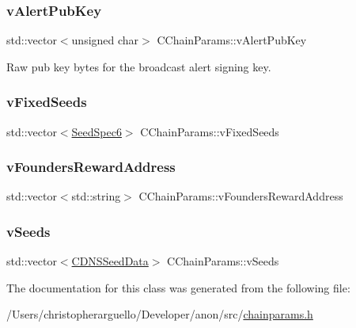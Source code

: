 \subsubsection{\texorpdfstring{v\+Alert\+Pub\+Key}{vAlertPubKey}}
{\footnotesize\ttfamily std\+::vector$<$unsigned char$>$ C\+Chain\+Params\+::v\+Alert\+Pub\+Key\hspace{0.3cm}{\ttfamily [protected]}}



Raw pub key bytes for the broadcast alert signing key. 

\mbox{\label{class_c_chain_params_a6853ff4c88ca3df1d864a8d72153614d}} 
\subsubsection{\texorpdfstring{v\+Fixed\+Seeds}{vFixedSeeds}}
{\footnotesize\ttfamily std\+::vector$<$\mbox{\hyperlink{struct_seed_spec6}{Seed\+Spec6}}$>$ C\+Chain\+Params\+::v\+Fixed\+Seeds\hspace{0.3cm}{\ttfamily [protected]}}

\mbox{\label{class_c_chain_params_a54c46bc5f678eda307507f3c4310361b}} 
\subsubsection{\texorpdfstring{v\+Founders\+Reward\+Address}{vFoundersRewardAddress}}
{\footnotesize\ttfamily std\+::vector$<$std\+::string$>$ C\+Chain\+Params\+::v\+Founders\+Reward\+Address\hspace{0.3cm}{\ttfamily [protected]}}

\mbox{\label{class_c_chain_params_a9ce50b4162fb2ebf5bd72ad4045aa70c}} 
\subsubsection{\texorpdfstring{v\+Seeds}{vSeeds}}
{\footnotesize\ttfamily std\+::vector$<$\mbox{\hyperlink{struct_c_d_n_s_seed_data}{C\+D\+N\+S\+Seed\+Data}}$>$ C\+Chain\+Params\+::v\+Seeds\hspace{0.3cm}{\ttfamily [protected]}}



The documentation for this class was generated from the following file\+:\begin{DoxyCompactItemize}
\item 
/\+Users/christopherarguello/\+Developer/anon/src/\mbox{\hyperlink{chainparams_8h}{chainparams.\+h}}\end{DoxyCompactItemize}
